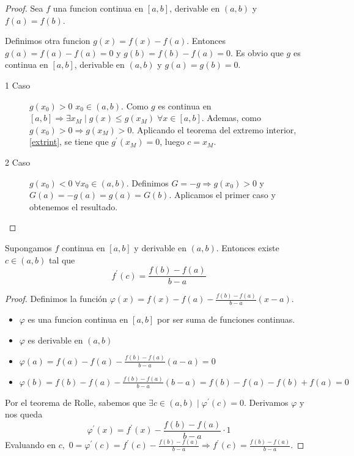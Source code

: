 \begin{proof}
	Sea \(f\) una funcion continua en \([a,b ]\), derivable en \((a,b )\) y \(f(a) = f(b )\).

	Definimos otra funcion \(g(x) = f(x) - f(a)\). Entonces \(g(a) = f(a) - f(a) = 0 \) y \(g(b) = f(b) - f(a) = 0 \). Es obvio que \(g\) es continua en \([a,b ]\), derivable en \((a,b )\) y \(g(a) = g(b) = 0 \).
	\begin{description}
		\item[1 Caso] \(g(x_0) > 0 \) \(x_0 \in (a,b )\). Como \(g \) es continua en \([a,b ] \Rightarrow \exists x_M \mid g(x) \leq g(x_M) \; \forall x \in [a,b]\). Ademas, como \(g(x_0) > 0 \Rightarrow g(x_M) > 0\). Aplicando el teorema del extremo interior, \ref{extrint}, se tiene que \(g^\prime (x_M) = 0\), luego \(c = x_M\).
		\item[2 Caso] \(g(x_0) < 0 \; \forall x_0 \in (a,b )\). Definimos \(G = -g \Rightarrow g(x_0) > 0\) y \(G(a) = -g(a) = g(a) = G(b )\). Aplicamos el primer caso y obtenemos el resultado.
	\end{description}
\end{proof}

\begin{theorem}
	Supongamos \(f \) continua en \([a,b ]\) y derivable en \((a,b )\). Entonces existe \(c \in (a,b )\) tal que
	\[
		f^\prime (c) = \frac{f(b) - f(a)}{b - a}
	\]
\end{theorem}
\begin{proof}
	Definimos la función \(\varphi(x) = f(x) - f(a) - \frac{f(b) - f(a)}{b - a} (x - a)\).
	\begin{itemize}
		\item \(\varphi\) es una funcion continua en \([a,b ]\) por ser suma de funciones continuas.
		\item \(\varphi\) es derivable en \((a,b )\)
		\item \(\varphi (a) = f(a) - f(a) - \frac{f(b) - f(a)}{b - a} (a - a) = 0\)
		\item \(\varphi (b) = f(b) - f(a) - \frac{f(b) - f(a)}{b - a} (b - a) = f(b) - f(a) - f(b) + f(a) = 0\)
	\end{itemize}
	Por el teorema de Rolle, sabemos que \(\exists c \in (a,b) \mid \varphi^\prime (c) = 0 \). Derivamos \(\varphi\) y nos queda
	\[
		\varphi^\prime (x) = f^\prime (x) - \frac{f(b) - f(a)}{b - a} \cdot 1
	\]
	Evaluando en \(c ,\) \(0 = \varphi^\prime (c) = f^\prime (c) - \frac{f(b) - f(a)}{b - a} \Rightarrow f^\prime (c) = \frac{f(b) - f(a)}{b - a }\).
\end{proof}

